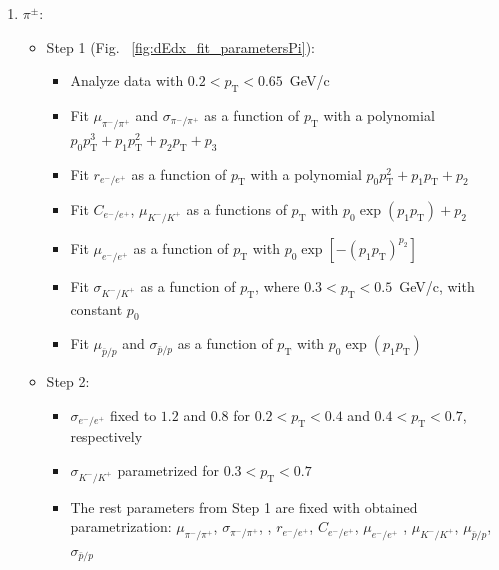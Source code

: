 \begin{enumerate}
	\item  $\pi^{\pm}$:
		\begin{itemize}
			\item Step 1 (Fig. ~\ref{fig:dEdx_fit_parametersPi}):
			\begin{itemize}
				\renewcommand\labelitemi{--}
				\item Analyze data with $0.2 < p_\textrm{T} < 0.65$~GeV/c
				\item Fit  $\mu_{\pi^-/\pi^+}$ and $\sigma_{\pi^-/\pi^+}$ as a function of $p_\textrm{T}$ with a polynomial  $p_0p_\textrm{T}^3+p_1p_\textrm{T}^2+p_2p_\textrm{T}+p_3$
				\item Fit $r_{e^-/e^+}$ as a function of $p_\textrm{T}$ with a polynomial $p_0p_\textrm{T}^2+p_1p_\textrm{T}+p_2$
				\item Fit  $C_{e^-/e^+}$, $\mu_{K^-/K^+}$ as a functions of $p_\textrm{T}$ with $p_0\exp\left(p_1p_\textrm{T}\right)+p_2$
				\item Fit  $\mu_{e^-/e^+}$ as a function of $p_\textrm{T}$ with $p_0\exp\left[-\left(p_1p_\textrm{T}\right)^{p_2}\right]$ 
				\item Fit $\sigma_{K^-/K^+}$ as a function of $p_\textrm{T}$, where $0.3<p_\textrm{T}<0.5$~GeV/c, with constant $p_0$ 
				\item Fit  $\mu_{\bar{p}/p}$ and $\sigma_{\bar{p}/p}$ as a function of $p_\textrm{T}$ with $p_0\exp\left(p_1p_\textrm{T}\right)$
			\end{itemize}
			\item Step 2:
				\begin{itemize}
					\renewcommand\labelitemi{--}
					\item $\sigma_{e^-/e^+}$ fixed to $1.2$ and $0.8$ for $0.2<p_\textrm{T}<0.4$ and $0.4<p_\textrm{T}<0.7$, respectively
					\item $\sigma_{K^-/K^+}$ parametrized for $0.3<p_\textrm{T}<0.7$
					\item  The rest parameters from Step 1 are fixed with obtained parametrization: $\mu_{\pi^-/\pi^+}$, $\sigma_{\pi^-/\pi^+}$, , $r_{e^-/e^+}$, $C_{e^-/e^+}$, $\mu_{e^-/e^+}$ , $\mu_{K^-/K^+}$, $\mu_{\bar{p}/p}$, $\sigma_{\bar{p}/p}$
				\end{itemize}	
		\end{itemize}		
\end{enumerate} 

